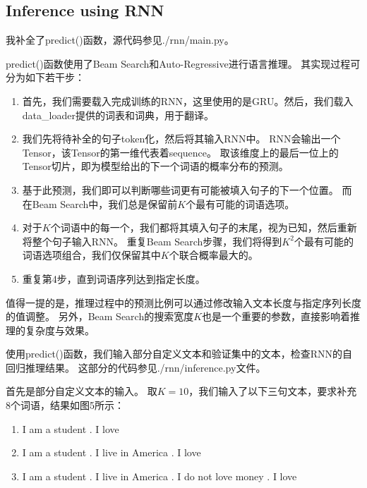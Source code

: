 \documentclass[12pt, a4paper]{article}
\begin{document}
    \subsection{Inference using RNN}

        我补全了predict()函数，源代码参见./rnn/main.py。

        predict()函数使用了Beam Search和Auto-Regressive进行语言推理。
        其实现过程可分为如下若干步：

        \begin{enumerate}

        \item 首先，我们需要载入完成训练的RNN，这里使用的是GRU。然后，我们载入data\_loader提供的词表和词典，用于翻译。

        \item 我们先将待补全的句子token化，然后将其输入RNN中。
        RNN会输出一个Tensor，该Tensor的第一维代表着sequence。
        取该维度上的最后一位上的Tensor切片，即为模型给出的下一个词语的概率分布的预测。

        \item 基于此预测，我们即可以判断哪些词更有可能被填入句子的下一个位置。
        而在Beam Search中，我们总是保留前$K$个最有可能的词语选项。

        \item 对于$K$个词语中的每一个，我们都将其填入句子的末尾，视为已知，然后重新将整个句子输入RNN。
        重复Beam Search步骤，我们将得到$K^2$个最有可能的词语选项组合，我们仅保留其中$K$个联合概率最大的。

        \item 重复第4步，直到词语序列达到指定长度。

        \end{enumerate}

        值得一提的是，推理过程中的预测比例可以通过修改输入文本长度与指定序列长度的值调整。
        另外，Beam Search的搜索宽度$K$也是一个重要的参数，直接影响着推理的复杂度与效果。

        使用predict()函数，我们输入部分自定义文本和验证集中的文本，检查RNN的自回归推理结果。
        这部分的代码参见./rnn/inference.py文件。

        首先是部分自定义文本的输入。
        取$K = 10$，我们输入了以下三句文本，要求补充8个词语，结果如图5所示：

        \begin{enumerate}

        \item I am a student . I love

        \item I am a student . I live in America . I love

        \item I am a student . I live in America . I do not love money . I love

        \end{enumerate}
\end{document}
